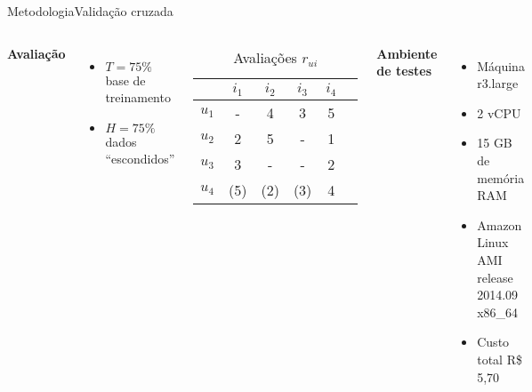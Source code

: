 \begin{frame}{Metodologia}{Validação cruzada}
\begin{columns}[t] 
\textbf{Avaliação}
\begin{itemize}
	\item $T=75\%$ base de treinamento
	\item $H=75\%$ dados ``escondidos''
\end{itemize}
\begin{table}[h]
\begin{center}
	\caption{Avaliações $r_{ui}$}
    \begin{tabular}{ | c | c | c | c | c | c |} 
    \hline
     & $i_1$ & $i_2$ & $i_3$ & $i_4$ \\ \hline
     $u_1$ & - & 4 & 3 & 5 \\ \hline
     $u_2$ & 2 & 5 & - & 1 \\ \hline
     $u_3$ & 3 & - & - & 2 \\ \hline
     $u_4$ & (5) & (2) & (3) & 4 \\ \hline
    \end{tabular}
\end{center}
\end{table}
\textbf{Ambiente de testes} 
\begin{itemize}
    \item Máquina r3.large
    \item 2 vCPU
    \item 15 GB de memória RAM
    \item Amazon Linux AMI release 2014.09 x86\_64
    \item Custo total R\$ 5,70
 \end{itemize}

\end{columns}
\end{frame}